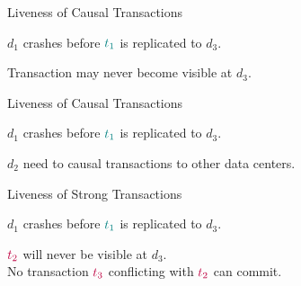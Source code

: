 \begin{frame}{Liveness of Causal Transactions}
  \begin{center}
    $d_{1}$ crashes before $\textcolor{teal}{t_{1}}$ is replicated to $d_{3}$.

    \vspace{0.20cm}

    \pause
    Transaction  may never become visible at $d_{3}$.
  \end{center}
\end{frame}

\begin{frame}{Liveness of Causal Transactions}
  \begin{center}
    $d_{1}$ crashes before $\textcolor{teal}{t_{1}}$ is replicated to $d_{3}$.

    \vspace{0.20cm}

    $d_{2}$ need to  causal transactions to other data centers.
  \end{center}
\end{frame}

\begin{frame}{Liveness of Strong Transactions}
  \begin{center}
    $d_{1}$ crashes before $\textcolor{teal}{t_{1}}$ is replicated to $d_{3}$.

    \vspace{0.50cm}

    \pause
    \vspace{0.30cm}
    $\textcolor{purple}{t_{2}}$ will never be visible at $d_{3}$. \\[3pt]
    \pause
    No transaction $\textcolor{purple}{t_{3}}$ conflicting with $\textcolor{purple}{t_{2}}$ can commit.
  \end{center}
\end{frame}

